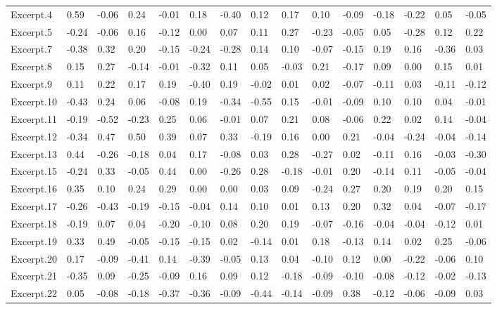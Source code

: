 \documentclass[
]{article}
\newenvironment{lltable}{\begin{landscape}\begin{center}\begin{ThreePartTable}}{\end{ThreePartTable}\end{center}\end{landscape}}
\begin{document}
\begin{lltable}
{\begin{longtable}{lllllllllllllll}
Excerpt.4 & 0.59 & -0.06 & 0.24 & -0.01 & 0.18 & -0.40 & 0.12 & 0.17 & 0.10 & -0.09 & -0.18 & -0.22 & 0.05 & -0.05\\
Excerpt.5 & -0.24 & -0.06 & 0.16 & -0.12 & 0.00 & 0.07 & 0.11 & 0.27 & -0.23 & -0.05 & 0.05 & -0.28 & 0.12 & 0.22\\
Excerpt.7 & -0.38 & 0.32 & 0.20 & -0.15 & -0.24 & -0.28 & 0.14 & 0.10 & -0.07 & -0.15 & 0.19 & 0.16 & -0.36 & 0.03\\
Excerpt.8 & 0.15 & 0.27 & -0.14 & -0.01 & -0.32 & 0.11 & 0.05 & -0.03 & 0.21 & -0.17 & 0.09 & 0.00 & 0.15 & 0.01\\
Excerpt.9 & 0.11 & 0.22 & 0.17 & 0.19 & -0.40 & 0.19 & -0.02 & 0.01 & 0.02 & -0.07 & -0.11 & 0.03 & -0.11 & -0.12\\
Excerpt.10 & -0.43 & 0.24 & 0.06 & -0.08 & 0.19 & -0.34 & -0.55 & 0.15 & -0.01 & -0.09 & 0.10 & 0.10 & 0.04 & -0.01\\
Excerpt.11 & -0.19 & -0.52 & -0.23 & 0.25 & 0.06 & -0.01 & 0.07 & 0.21 & 0.08 & -0.06 & 0.22 & 0.02 & 0.14 & -0.04\\
Excerpt.12 & -0.34 & 0.47 & 0.50 & 0.39 & 0.07 & 0.33 & -0.19 & 0.16 & 0.00 & 0.21 & -0.04 & -0.24 & -0.04 & -0.14\\
Excerpt.13 & 0.44 & -0.26 & -0.18 & 0.04 & 0.17 & -0.08 & 0.03 & 0.28 & -0.27 & 0.02 & -0.11 & 0.16 & -0.03 & -0.30\\
Excerpt.15 & -0.24 & 0.33 & -0.05 & 0.44 & 0.00 & -0.26 & 0.28 & -0.18 & -0.01 & 0.20 & -0.14 & 0.11 & -0.05 & -0.04\\
Excerpt.16 & 0.35 & 0.10 & 0.24 & 0.29 & 0.00 & 0.00 & 0.03 & 0.09 & -0.24 & 0.27 & 0.20 & 0.19 & 0.20 & 0.15\\
Excerpt.17 & -0.26 & -0.43 & -0.19 & -0.15 & -0.04 & 0.14 & 0.10 & 0.01 & 0.13 & 0.20 & 0.32 & 0.04 & -0.07 & -0.17\\
Excerpt.18 & -0.19 & 0.07 & 0.04 & -0.20 & -0.10 & 0.08 & 0.20 & 0.19 & -0.07 & -0.16 & -0.04 & -0.04 & -0.12 & 0.01\\
Excerpt.19 & 0.33 & 0.49 & -0.05 & -0.15 & -0.15 & 0.02 & -0.14 & 0.01 & 0.18 & -0.13 & 0.14 & 0.02 & 0.25 & -0.06\\
Excerpt.20 & 0.17 & -0.09 & -0.41 & 0.14 & -0.39 & -0.05 & 0.13 & 0.04 & -0.10 & 0.12 & 0.00 & -0.22 & -0.06 & 0.10\\
Excerpt.21 & -0.35 & 0.09 & -0.25 & -0.09 & 0.16 & 0.09 & 0.12 & -0.18 & -0.09 & -0.10 & -0.08 & -0.12 & -0.02 & -0.13\\
Excerpt.22 & 0.05 & -0.08 & -0.18 & -0.37 & -0.36 & -0.09 & -0.44 & -0.14 & -0.09 & 0.38 & -0.12 & -0.06 & -0.09 & 0.03\\

\end{longtable}}
\end{lltable}
\end{document}
